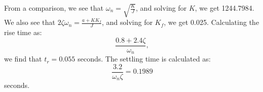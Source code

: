 \documentclass[11pt]{article}
\begin{document}
From a comparison, we see that \(\omega_n = \sqrt{\frac{K}{J}}\), and solving for \(K\), we get 1244.7984.
We also see that \(2\zeta\omega_n = \frac{a + KK_f}{J}\), and solving for \(K_f\), we get 0.025.
\newline\newline
\noindent
Calculating the rise time as:
\begin{equation*}
    \frac{0.8 + 2.4\zeta}{\omega_n},
\end{equation*}
we find that \(t_r = 0.055\) seconds.
The settling time is calculated as:
\begin{equation*}
    \frac{3.2}{\omega_n\zeta} = 0.1989
\end{equation*}
seconds.
\end{document}
